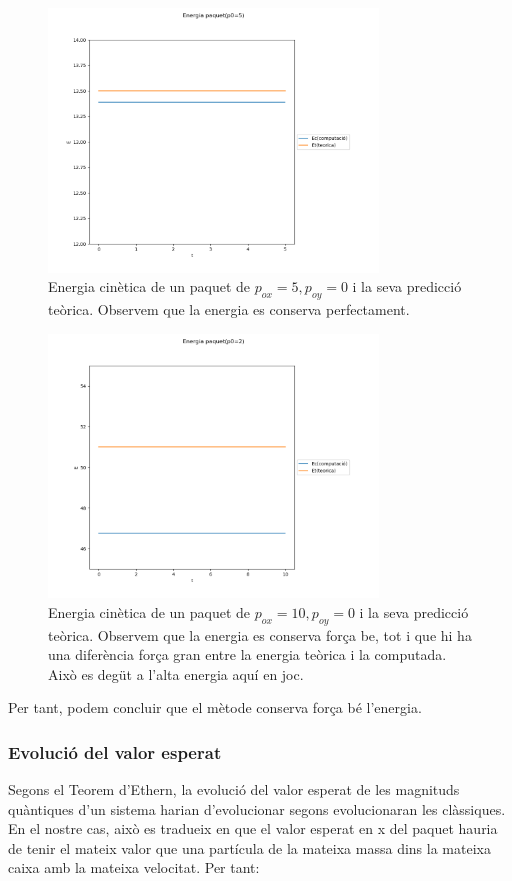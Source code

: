 \documentclass{article}
\begin{document}
\begin{figure}[H]
	\includegraphics[width=\textwidth,height=7cm]{Ep05.png}
	\caption{Energia cinètica de un paquet de \(p_{ox}=5,p_{oy}=0\) i la seva predicció teòrica. Observem que la energia es conserva perfectament. }
\end{figure}
\begin{figure}[H]
	\includegraphics[width=\textwidth,height=7cm]{Ep010.png}
	\caption{Energia cinètica de un paquet de \(p_{ox}=10,p_{oy}=0\) i la seva predicció teòrica. Observem que la energia es conserva força be, tot i que hi ha una diferència força gran entre la energia teòrica i la computada. Això es degüt a l'alta energia aquí en joc. }
\end{figure}

Per tant, podem concluir que el mètode conserva força bé l'energia.

\subsubsection{Evolució del valor esperat}

Segons el Teorem d'Ethern, la evolució del valor esperat de les magnituds quàntiques d'un sistema harian d'evolucionar segons evolucionaran les clàssiques. En el nostre cas, això es tradueix en que el valor esperat en x del paquet hauria de tenir el mateix valor que una partícula de la mateixa massa dins la mateixa caixa amb la mateixa velocitat. Per tant:
\end{document}
